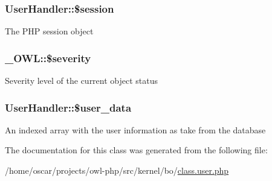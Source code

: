 \subsubsection[{\$session}]{\setlength{\rightskip}{0pt plus 5cm}UserHandler::\$session}\label{classUserHandler_af097b7fd1ee085b46a6c34e071508a7f}
The PHP session object 
\subsubsection[{\$severity}]{\setlength{\rightskip}{0pt plus 5cm}\_\-OWL::\$severity}\label{class__OWL_ad26b40a9dbbacb33e299b17826f8327c}
Severity level of the current object status 
\subsubsection[{\$user\_\-data}]{\setlength{\rightskip}{0pt plus 5cm}UserHandler::\$user\_\-data}\label{classUserHandler_ae7a2d59eee65560ac96b860e828bb445}
An indexed array with the user information as take from the database 

The documentation for this class was generated from the following file:\begin{DoxyCompactItemize}
\item 
/home/oscar/projects/owl-\/php/src/kernel/bo/\hyperlink{class_8user_8php}{class.user.php}\end{DoxyCompactItemize}

